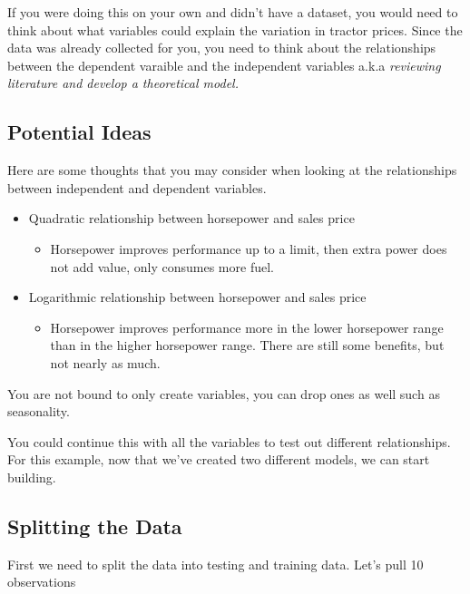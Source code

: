 \documentclass[
]{article}
\providecommand{\tightlist}{%
  \setlength{\itemsep}{0pt}\setlength{\parskip}{0pt}}
\begin{document}
If you were doing this on your own and didn't have a dataset, you would
need to think about what variables could explain the variation in
tractor prices. Since the data was already collected for you, you need
to think about the relationships between the dependent varaible and the
independent variables a.k.a \emph{reviewing literature and develop a
theoretical model.}

\hypertarget{potential-ideas}{%
\subsection{Potential Ideas}\label{potential-ideas}}

Here are some thoughts that you may consider when looking at the
relationships between independent and dependent variables.

\begin{itemize}
\tightlist
\item
  Quadratic relationship between horsepower and sales price

  \begin{itemize}
  \tightlist
  \item
    Horsepower improves performance up to a limit, then extra power does
    not add value, only consumes more fuel.
  \end{itemize}
\item
  Logarithmic relationship between horsepower and sales price

  \begin{itemize}
  \tightlist
  \item
    Horsepower improves performance more in the lower horsepower range
    than in the higher horsepower range. There are still some benefits,
    but not nearly as much.
  \end{itemize}
\end{itemize}

You are not bound to only create variables, you can drop ones as well
such as seasonality.

You could continue this with all the variables to test out different
relationships. For this example, now that we've created two different
models, we can start building.

\hypertarget{splitting-the-data}{%
\subsection{Splitting the Data}\label{splitting-the-data}}

First we need to split the data into testing and training data. Let's
pull 10 observations
\end{document}
